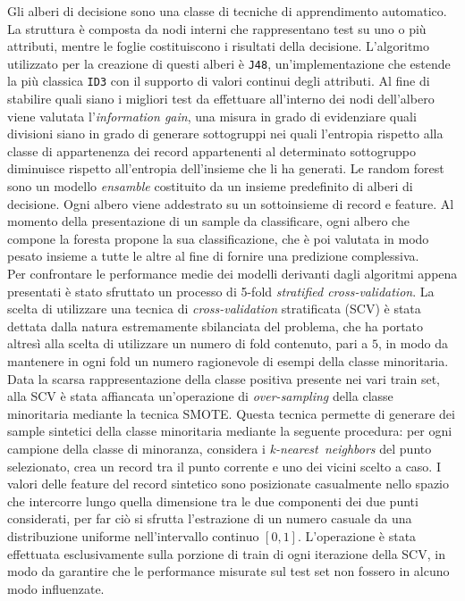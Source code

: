 Gli alberi di decisione sono una classe di tecniche di apprendimento automatico.
La struttura è composta da nodi interni che rappresentano test su uno o più attributi, mentre le foglie costituiscono i risultati della decisione. L'algoritmo utilizzato per la creazione di questi alberi è \texttt{J48}, un'implementazione che estende la più classica \texttt{ID3} con il supporto di valori continui degli attributi. Al fine di stabilire quali siano i migliori test da effettuare all'interno dei nodi dell'albero viene valutata l'\textit{information gain}, una misura in grado di evidenziare quali divisioni siano in grado di generare sottogruppi nei quali l'entropia rispetto alla classe di appartenenza dei record appartenenti al determinato sottogruppo diminuisce rispetto all'entropia dell'insieme che li ha generati.
Le random forest sono un modello \textit{ensamble} costituito da un insieme predefinito di alberi di decisione. Ogni albero viene addestrato su un sottoinsieme di record e feature. Al momento della presentazione di un sample da classificare, ogni albero che compone la foresta propone la sua classificazione, che è poi valutata in modo pesato insieme a tutte le altre al fine di fornire una predizione complessiva.\\
Per confrontare le performance medie dei modelli derivanti dagli algoritmi appena presentati è stato sfruttato un processo di 5-fold \textit{stratified cross-validation}.
La scelta di utilizzare una tecnica di \textit{cross-validation} stratificata (SCV) è stata dettata dalla natura estremamente sbilanciata del problema, che ha portato altresì alla scelta di utilizzare un numero di fold contenuto, pari a $5$, in modo da mantenere in ogni fold un numero ragionevole di esempi della classe minoritaria.
Data la scarsa rappresentazione della classe positiva presente nei vari train set, alla SCV è stata affiancata un'operazione di \textit{over-sampling} della classe minoritaria mediante la tecnica SMOTE. 
Questa tecnica permette di generare dei sample sintetici della classe minoritaria mediante la seguente procedura: per ogni campione della classe di minoranza, considera i \textit{k-nearest neighbors} del punto selezionato, crea un record tra il punto corrente e uno dei vicini scelto a caso. 
I valori delle feature del record sintetico sono posizionate casualmente nello spazio che intercorre lungo quella dimensione tra le due componenti dei due punti considerati, per far ciò si sfrutta l'estrazione di un numero casuale da una distribuzione uniforme nell'intervallo continuo $[0, 1]$.
L'operazione è stata effettuata esclusivamente sulla porzione di train di ogni iterazione della SCV, in modo da garantire che le performance misurate sul test set non fossero in alcuno modo influenzate.
